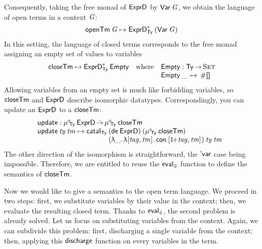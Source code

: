 \newcommand{\SYMBEmpty}{\F{Empty}\xspace}
\newcommand{\Empty}[1]{\SYMBEmpty\:#1}

\newcommand{\SYMBopenTerm}{\F{openTm}\xspace}
\newcommand{\openTerm}[1]{\SYMBopenTerm\: #1}
\newcommand{\closeTerm}{\F{closeTm}}

\newcommand{\update}{\F{update}}

Consequently, taking the free monad of \(\HExprD\) by \(\SYMBVar\:
\V{G}\), we obtain the language of open terms in a context \(\V{G}\):
%
\[
\openTerm{\V{G}} \mapsto \FreeIMonad{\HExprD}{\Ty}{(\SYMBVar\:\V{G})}
\]
%
In this setting, the language of closed terms corresponds to the free
monad assigning an empty set of values to variables
%
\[
\closeTerm \mapsto \FreeIMonad{\HExprD}{\Ty}{\SYMBEmpty}
\quad
\mbox{where}
\quad
\stk{
\SYMBEmpty : \Ty \To \Set \\
\begin{array}{@{}l@{\:\:\mapsto\:\:}l}
\Empty{\_}   & \Zero \\
\end{array}
}\]
%
Allowing variables from an empty set is much like forbidding variables,
so \(\closeTerm\) and \(\HExprD\) describe isomorphic
datatypes. Correspondingly, you can update an \(\HExprD\) to a
\(\closeTerm\):
%
\[\stk{
\update : \muide{\Ty}{\HExprD} \DotTo \muide{\Ty}{\closeTerm} \\
\begin{array}{@{}l@{}l}
\update\: \V{ty}\: \V{tm} \mapsto \cataI_{\Ty}\: & (\toIDesc{\HExprD})\:
                                                  (\muide{\Ty}{\closeTerm})\: \\
                                                & (\LAM{\_} \LAM{\pair{\V{tag}}{\V{tm}}{}} \Con{\pair{\Su{\V{tag}}}{\V{tm}}{}})\:
                                                  \V{ty}\:
                                                  \V{tm}
\end{array}
}\]
% 
The other direction of the isomorphism is straightforward, the
$\SYMBDVar$ case being impossible. Therefore, we are entitled to
reuse the $\evalH$ function to define the semantics of $\closeTerm$.

\newcommand{\discharge}{\F{discharge}}

Now we would like to give a semantics to the open term language. We
proceed in two steps: first, we substitute variables by their value in
the context; then, we evaluate the resulting closed term. Thanks to
$\evalH$, the second problem is already solved. Let us focus on
substituting variables from the context. Again, we can subdivide this
problem: first, discharging a single variable from the context; then,
applying this $\discharge$ function on every variables in the term.

